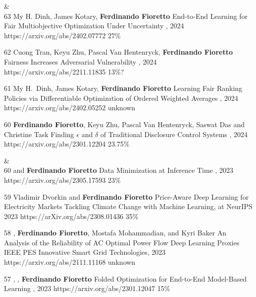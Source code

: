 \begin{pubs}

{}&\nemph{\rule{0.5\linewidth}{0.5pt}}\\[1em]

\wsentry
	{63}
	{\student{}My H. Dinh, \student{} James Kotary, {\bf Ferdinando Fioretto}}
	{End-to-End Learning for Fair Multiobjective Optimization Under Uncertainty}
	{\procUAI, 2024}
	{https://arxiv.org/abs/2402.07772}
	{27\%}


\confentry
	{62}%
	{\student{}Cuong Tran, Keyu Zhu, Pascal Van Hentenryck, {\bf Ferdinando Fioretto}}
	{Fairness Increases Adversarial Vulnerability}
	{\procIJCAI, 2024}
	{https://arxiv.org/abs/2211.11835}
	{13\%?}

\confentry
	{61}
	{\student{} My H.~Dinh, \student{} James Kotary, {\bf Ferdinando Fioretto}}
	{Learning Fair Ranking Policies via Differentiable Optimization of Ordered Weighted Averages}
	{\procFAccT, 2024}
	{https://arxiv.org/abs/2402.05252}
	{unknown}

\confentry
	{60}
	{{\bf Ferdinando Fioretto}, Keyu Zhu, Pascal Van Hentenryck, \student{} Saswat Das and Christine Task}
  	{Finding $\epsilon$ and $\delta$ of Traditional Disclosure Control Systems}
	{\procAAAI, 2024}
	{https://arxiv.org/abs/2301.12204}
	{23.75\%}

{}&\nemph{\rule{0.5\linewidth}{0.5pt}}\\[1em]

\confentry
	{60}
	{ and {\bf Ferdinando Fioretto}}
	{Data Minimization at Inference Time}
	{\procNeurIPS, 2023}
	{https://arxiv.org/abs/2305.17593}
	{23\%}

\confentry
	{59}
 	{Vladimir Dvorkin and {\bf Ferdinando Fioretto}}
  	{Price-Aware Deep Learning for Electricity Markets}
  	{Tackling Climate Change with Machine Learning, at NeurIPS 2023}
  	{https://arXiv.org/abs/2308.01436}
  	{35\%}

\confentry
	{58}
	{, {\bf Ferdinando Fioretto}, Mostafa Mohammadian, and Kyri Baker}
	{An Analysis of the Reliability of AC Optimal Power Flow Deep Learning Proxies}
	{IEEE PES Innovative Smart Grid Technologies, 2023}
	{https://arxiv.org/abs/2111.11168}
	{unknown}

\confentry 
	{57} %
	{, , {\bf Ferdinando Fioretto}}
	{Folded Optimization for End-to-End Model-Based Learning}
	{\procIJCAI, 2023}
	{https://arxiv.org/abs/2301.12047}
	{15\%}


\end{pubs}
